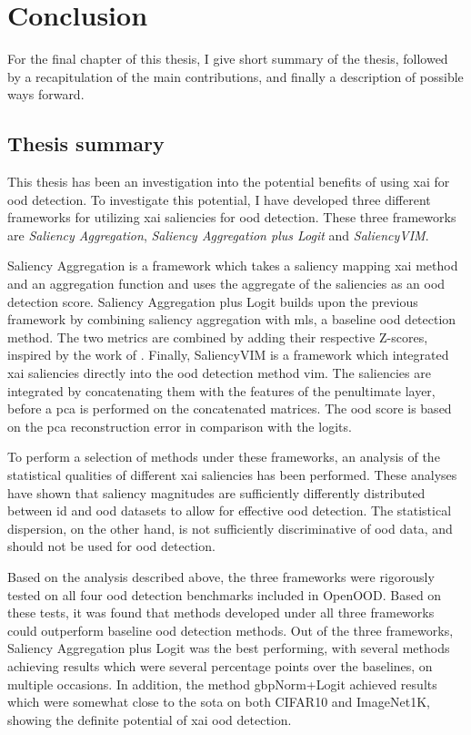 \documentclass[UKenglish]{uiomasterthesis} %
\theoremstyle{definition}
\begin{document}
\chapter{Conclusion} \label{chapter:conclusion}

For the final chapter of this thesis, I give short summary of the thesis, followed by a recapitulation of the main contributions, and finally a description of possible ways forward.

\section{Thesis summary}

This thesis has been an investigation into the potential benefits of using \ac{xai} for \ac{ood} detection. To investigate this potential, I have developed three different frameworks for utilizing \ac{xai} saliencies for \ac{ood} detection. These three frameworks are {\it Saliency Aggregation}, {\it Saliency Aggregation plus Logit} and {\it SaliencyVIM}.

Saliency Aggregation is a framework which takes a saliency mapping \ac{xai} method and an aggregation function and uses the aggregate of the saliencies as an \ac{ood} detection score. Saliency Aggregation plus Logit builds upon the previous framework by combining saliency aggregation with \ac{mls}, a baseline \ac{ood} detection method. The two metrics are combined by adding their respective Z-scores, inspired by the work of \cite{combood}. Finally, SaliencyVIM is a framework which integrated \ac{xai} saliencies directly into the \ac{ood} detection method \ac{vim}. The saliencies are integrated by concatenating them with the features of the penultimate layer, before a \ac{pca} is performed on the concatenated matrices. The \ac{ood} score is based on the \ac{pca} reconstruction error in comparison with the logits.

To perform a selection of methods under these frameworks, an analysis of the statistical qualities of different \ac{xai} saliencies has been performed. These analyses have shown that saliency magnitudes are sufficiently differently distributed between \ac{id} and \ac{ood} datasets to allow for effective \ac{ood} detection. The statistical dispersion, on the other hand, is not sufficiently discriminative of \ac{ood} data, and should not be used for \ac{ood} detection.

Based on the analysis described above, the three frameworks were rigorously tested on all four \ac{ood} detection benchmarks included in OpenOOD. Based on these tests, it was found that methods developed under all three frameworks could outperform baseline \ac{ood} detection methods. Out of the three frameworks, Saliency Aggregation plus Logit was the best performing, with several methods achieving results which were several percentage points over the baselines, on multiple occasions. In addition, the method \ac{gbp}Norm+Logit achieved results which were somewhat close to the \ac{sota} on both CIFAR10 and ImageNet1K, showing the definite potential of \ac{xai} \ac{ood} detection.
\end{document}
